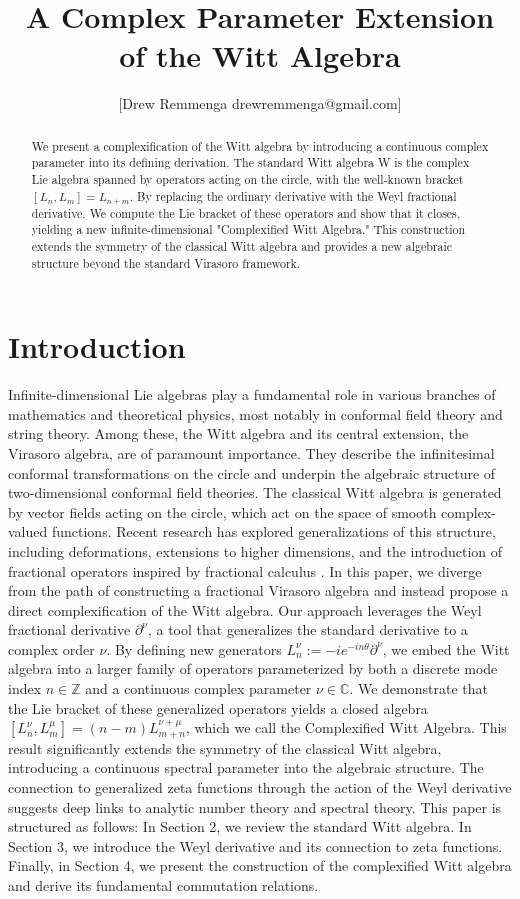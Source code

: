 \documentclass{artjlt}
\title{A Complex Parameter Extension of the Witt Algebra}
\author{[Drew Remmenga drewremmenga@gmail.com]}
\newcommand{\?}{\textbackslash}
\newcommand{\C}{\mathbb{C}}
\newcommand{\Z}{\mathbb{Z}}
\begin{document}
\maketitle
\begin{abstract}
  We present a complexification of the Witt algebra by introducing a continuous complex parameter into its defining derivation. The standard Witt algebra W is the complex Lie algebra spanned by operators acting on the circle, with the well-known bracket $[L_n,L_m]= L_{n+m}$. 
  By replacing the ordinary derivative with the Weyl fractional derivative. We compute the Lie bracket of these operators and show that it closes, yielding a new infinite-dimensional "Complexified Witt Algebra." 
  This construction extends the symmetry of the classical Witt algebra and provides a new algebraic structure beyond the standard Virasoro framework.
  \end{abstract}
\section{Introduction}
Infinite-dimensional Lie algebras play a fundamental role in various branches of mathematics and theoretical physics, most notably in conformal field theory and string theory. Among these, the Witt algebra and its central extension, the Virasoro algebra, are of paramount importance. They describe the infinitesimal conformal transformations on the circle and underpin the algebraic structure of two-dimensional conformal field theories.\cite{Schottenloher1997}
The classical Witt algebra is generated by vector fields acting on the circle, which act on the space of smooth complex-valued functions. Recent research has explored generalizations of this structure, including deformations, extensions to higher dimensions, and the introduction of fractional operators inspired by fractional calculus \cite{pakianathan2010generalizedwittalgebrasvariable}\cite{La_Nave_2019}.
In this paper, we diverge from the path of constructing a fractional Virasoro algebra and instead propose a direct complexification of the Witt algebra. Our approach leverages the Weyl fractional derivative $\partial^\nu$, a tool that generalizes the standard derivative to a complex order $\nu$. By defining new generators $L^\nu_n:= -i e^{-i n \theta}\partial^\nu$, we embed the Witt algebra into a larger family of operators parameterized by both a discrete mode index $n\in \Z$
 and a continuous complex parameter $\nu \in \C$.
We demonstrate that the Lie bracket of these generalized operators yields a closed algebra $[L^\nu_n,L^\mu_m]=(n-m)L_{m+n}^{\nu+\mu}$, 
which we call the Complexified Witt Algebra. 
This result significantly extends the symmetry of the classical Witt algebra, introducing a continuous spectral parameter into the algebraic structure. The connection to generalized zeta functions through the action of the Weyl derivative suggests deep links to analytic number theory and spectral theory.
This paper is structured as follows: In Section 2, we review the standard Witt algebra. In Section 3, we introduce the Weyl derivative and its connection to zeta functions. Finally, in Section 4, we present the construction of the complexified Witt algebra and derive its fundamental commutation relations.
\end{document}
